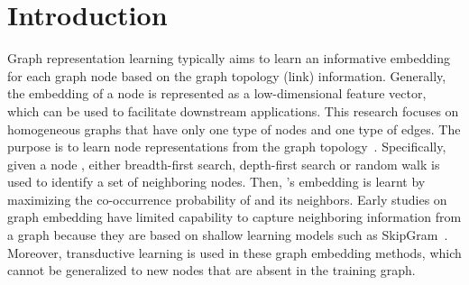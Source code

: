 \documentclass[runningheads]{llncs}
\begin{document}
\section{Introduction}
Graph representation learning typically aims to learn an informative embedding for each graph node based on the graph topology (link) information.
Generally, the embedding of a node is represented as a low-dimensional feature vector, which can be used to facilitate downstream applications.
This research focuses on homogeneous graphs that have only one type of nodes and one type of edges. The purpose is to learn node representations from the graph topology~\cite{grover2016node2vec,perozzi2014deepwalk,dai2016discriminative}.
Specifically, given a node , either breadth-first search, depth-first search or random walk is used to identify a set of neighboring nodes. Then, 's embedding is learnt by maximizing the co-occurrence probability of  and its neighbors.
Early studies on graph embedding have limited capability to capture neighboring information from a graph because they are based on shallow learning models such as SkipGram~\cite{mikolov2013distributed}.
Moreover, transductive learning is used in these graph embedding methods, which cannot be generalized to new nodes that are absent in the training graph.
\end{document}
